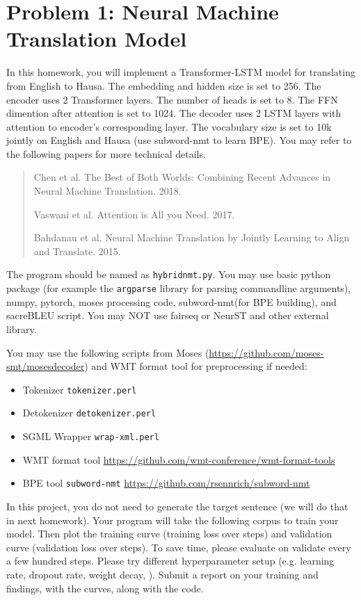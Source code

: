 \documentclass[12pt,letterpaper]{article}
\begin{document}
\section*{Problem 1: Neural Machine Translation Model} 
In this homework, you will implement a Transformer-LSTM model for translating from English to Hausa. 
The embedding and hidden size is set to 256. 
The encoder uses 2 Transformer layers. The number of heads is set to 8. The FFN dimention after attention is set to 1024.
The decoder uses 2 LSTM layers with attention to encoder's corresponding layer. 
The vocabulary size is set to 10k jointly on English and Hausa (use subword-nmt to learn BPE).
You may refer to the following papers for more technical details. 

\begin{quote}
  Chen et al. The Best of Both Worlds:
  Combining Recent Advances in Neural Machine Translation. 2018.
  
  Vaswani et al. Attention is All you Need. 2017.

  Bahdanau et al. Neural Machine Translation by Jointly Learning to Align and Translate. 2015.
\end{quote}

The program should be named as \texttt{hybridnmt.py}.
You may use basic python package (for example the \texttt{argparse} library for parsing commandline arguments), numpy, pytorch, moses processing code, subword-nmt(for BPE building), and sacreBLEU script. 
You may NOT use fairseq or NeurST and other external library. 

You may use the following scripts from Moses (\url{https://github.com/moses-smt/mosesdecoder}) and WMT format tool for preprocessing if needed:
\begin{itemize}
  \item Tokenizer \verb|tokenizer.perl|
  \item Detokenizer \verb|detokenizer.perl|
  \item SGML Wrapper \verb|wrap-xml.perl|
  \item WMT format tool \url{https://github.com/wmt-conference/wmt-format-tools}
  \item BPE tool \verb|subword-nmt| \url{https://github.com/rsennrich/subword-nmt}
\end{itemize}

In this project, you do not need to generate the target sentence (we will do that in next homework). 
Your program will take the following corpus to train your model. 
Then plot the training curve (training loss over steps) and validation curve (validation loss over steps). 
To save time, please evaluate on validate every a few hundred steps. 
Please try different hyperparameter setup (e.g. learning rate, dropout rate, weight decay, ).
Submit a report on your training and findings, with the curves, along with the code. 
\end{document}
